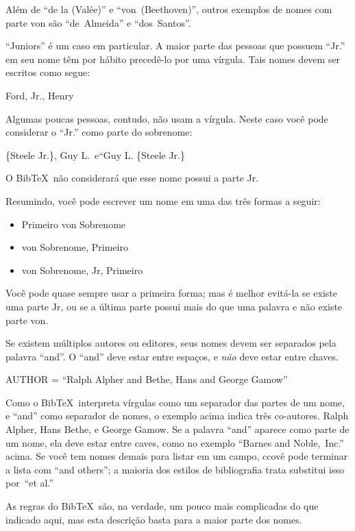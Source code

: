 \documentclass[article,openany]{memoir}
\newenvironment{exemplo}{\begin{center}}{\end{center}}
\begin{document}
Além de ``de la (Valée)'' e ``von~(Beethoven)'', outros exemplos de
nomes com parte von são ``de~Almeida'' e ``dos~Santos''.


``Juniors'' é um caso em particular. A maior parte das pessoas que
possuem ``Jr.'' em seu nome têm por hábito precedê-lo por uma
vírgula. Tais nomes devem ser escritos como segue:

\begin{exemplo}
Ford, Jr., Henry
\end{exemplo}

Algumas poucas pessoas, contudo, não usam a vírgula. Neste caso você
pode considerar o ``Jr.'' como parte do sobrenome:

\begin{exemplo}
\{Steele Jr.\}, Guy L.\quad\ e\quad ``Guy L. \{Steele Jr.\}
\end{exemplo}
O Bib\TeX\ não considerará que esse nome possui a parte Jr.

\smallskip

Resumindo, você pode escrever um nome em uma das três formas a seguir:
\begin{itemize}
\item Primeiro von Sobrenome
\item von  Sobrenome, Primeiro
\item von Sobrenome, Jr, Primeiro
\end{itemize}

Você pode quase sempre usar a primeira forma; mas é melhor evitá-la se
existe uma parte Jr, ou se a última parte possui mais do que uma
palavra e não existe parte von.

Se existem múltiplos autores ou editores, seus nomes devem ser
separados pela palavra ``and''. O ``and'' deve estar entre espaços, e
\emph{não} deve estar entre chaves.

\begin{exemplo}
AUTHOR = ``Ralph Alpher and Bethe, Hans and George Gamow''
\end{exemplo}

Como o Bib\TeX\ interpreta vírgulas como um separador das partes de um
nome, e ``and'' como separador de nomes, o exemplo acima indica três
co-autores. Ralph Alpher, Hans Bethe, e George Gamow. Se a palavra
``and'' aparece como parte de um nome, ela deve estar entre caves,
como no exemplo ``Barnes and Noble,~Inc.'' acima. Se você tem nomes
demais para listar em um campo, ccovê pode terminar a lista com ``and
others''; a maioria dos estilos de bibliografia trata substitui isso
por~``et al.''

As regras do Bib\TeX\ são, na verdade, um pouco mais complicadas do
que indicado aqui, mas esta descrição basta para a maior parte dos
nomes.
\end{document}
